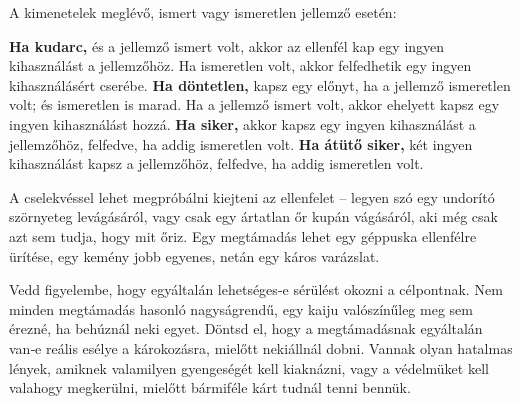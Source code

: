 A kimenetelek meglévő, ismert vagy ismeretlen jellemző esetén:

\begin{itemize}
    \failureitem \textbf{Ha kudarc,} és a jellemző ismert volt, akkor az ellenfél kap egy ingyen kihasználást a jellemzőhöz. Ha ismeretlen volt, akkor felfedhetik egy ingyen kihasználásért cserébe.
    \tieitem \textbf{Ha döntetlen,} kapsz egy előnyt, ha a jellemző ismeretlen volt; és ismeretlen is marad. Ha a jellemző ismert volt, akkor ehelyett kapsz egy ingyen kihasználást hozzá.
    \successitem \textbf{Ha siker,} akkor kapsz egy ingyen kihasználást a jellemzőhöz, felfedve, ha addig ismeretlen volt.
    \successwithstyleitem \textbf{Ha átütő siker,} két ingyen kihasználást kapsz a jellemzőhöz, felfedve, ha addig ismeretlen volt.
\end{itemize}

\newpage



A  cselekvéssel lehet megpróbálni kiejteni az ellenfelet – legyen szó egy undorító szörnyeteg levágásáról, vagy csak egy ártatlan őr kupán vágásáról, aki még csak azt sem tudja, hogy mit őriz. Egy megtámadás lehet egy géppuska ellenfélre ürítése, egy kemény jobb egyenes, netán egy káros varázslat.

Vedd figyelembe, hogy egyáltalán lehetséges‑e sérülést okozni a célpontnak. Nem minden megtámadás hasonló nagyságrendű, egy kaiju valószínűleg meg sem érezné, ha behúznál neki egyet. Döntsd el, hogy a megtámadásnak egyáltalán van‑e reális esélye a károkozásra, mielőtt nekiállnál dobni. Vannak olyan hatalmas lények, amiknek valamilyen gyengeségét kell kiaknázni, vagy a védelmüket kell valahogy megkerülni, mielőtt bármiféle kárt tudnál tenni bennük.

